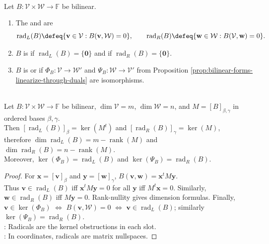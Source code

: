 \begin{definition} \label{def:bilinear-left-right-radicals} \\
Let $B:\mathcal{V}\times\mathcal{W}\to\mathbb{F}$ be bilinear.
\begin{enumerate}[label=(\roman*)]
\setlength{\itemsep}{0pt}
\item The  and  are
\[
\operatorname{rad}_{L}(B)\defeq\{\mathbf{v}\in\mathcal{V}:B(\mathbf{v},\mathcal{W})=0\},
\qquad
\operatorname{rad}_{R}(B)\defeq\{\mathbf{w}\in\mathcal{W}:B(\mathcal{V},\mathbf{w})=0\}.
\]
\item $B$ is  if $\operatorname{rad}_{L}(B)=\{\mathbf{0}\}$ and  if $\operatorname{rad}_{R}(B)=\{\mathbf{0}\}$.
\item $B$ is  or  if $\Phi_B:\mathcal{V}\to\mathcal{W}'$ and $\Psi_B:\mathcal{W}\to\mathcal{V}'$ from Proposition \ref{prop:bilinear-forms-linearize-through-duals} are isomorphisms.
\end{enumerate}
\end{definition}

\begin{proposition} \label{prop:bilinear-radicals-matrix-and-dual-maps} \\
Let $B:\mathcal{V}\times\mathcal{W}\to\mathbb{F}$ be bilinear, $\dim\mathcal{V}=m$, $\dim\mathcal{W}=n$, and $M=[B]_{\beta,\gamma}$ in ordered bases $\beta,\gamma$.\\
Then $[\operatorname{rad}_{L}(B)]_{\beta}=\ker(M^t)$ and $[\operatorname{rad}_{R}(B)]_{\gamma}=\ker(M)$,\\
therefore $\dim\operatorname{rad}_{L}(B)=m-\operatorname{rank}(M)$ and $\dim\operatorname{rad}_{R}(B)=n-\operatorname{rank}(M)$.\\
Moreover, $\ker(\Phi_B)=\operatorname{rad}_{L}(B)$ and $\ker(\Psi_B)=\operatorname{rad}_{R}(B)$.
\begin{proof}
For $\mathbf{x}=[\mathbf{v}]_{\beta}$ and $\mathbf{y}=[\mathbf{w}]_{\gamma}$, $B(\mathbf{v},\mathbf{w})=\mathbf{x}^{t}M\mathbf{y}$.\\
Thus $\mathbf{v}\in\operatorname{rad}_{L}(B)$ iff $\mathbf{x}^{t}M\mathbf{y}=0$ for all $\mathbf{y}$ iff $M^t\mathbf{x}=0$. Similarly, $\mathbf{w}\in\operatorname{rad}_{R}(B)$ iff $M\mathbf{y}=0$. Rank-nullity gives dimension formulas. Finally, $\mathbf{v}\in\ker(\Phi_B)$ $\Longleftrightarrow$ $B(\mathbf{v},\mathcal{W})=0$ $\Longleftrightarrow$ $\mathbf{v}\in\operatorname{rad}_{L}(B)$; similarly $\ker(\Psi_B)=\operatorname{rad}_{R}(B)$.\\
: Radicals are the kernel obstructions in each slot.\\
: In coordinates, radicals are matrix nullspaces.
\end{proof}
\end{proposition}

